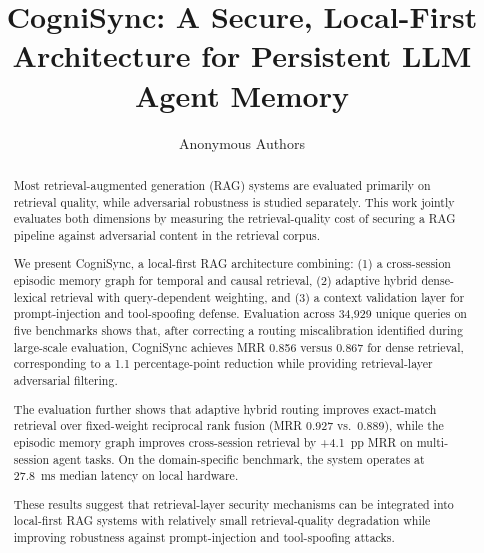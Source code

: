 \documentclass[sigconf]{acmart}
\begin{document}
\title{CogniSync: A Secure, Local-First Architecture for Persistent LLM
Agent Memory}

\author{Anonymous Authors}
\renewcommand{\shortauthors}{Anonymous et al.}

\begin{abstract}

Most retrieval-augmented generation (RAG) systems are evaluated primarily on retrieval quality, while adversarial robustness is studied separately. This work jointly evaluates both dimensions by measuring the retrieval-quality cost of securing a RAG pipeline against adversarial content in the retrieval corpus.

We present CogniSync, a local-first RAG architecture combining: (1) a cross-session episodic memory graph for temporal and causal retrieval, (2) adaptive hybrid dense-lexical retrieval with query-dependent weighting, and (3) a context validation layer for prompt-injection and tool-spoofing defense. Evaluation across 34,929 unique queries on five benchmarks shows that, after correcting a routing miscalibration identified during large-scale evaluation, CogniSync achieves MRR 0.856 versus 0.867 for dense retrieval, corresponding to a 1.1 percentage-point reduction while providing retrieval-layer adversarial filtering.

The evaluation further shows that adaptive hybrid routing improves exact-match retrieval over fixed-weight reciprocal rank fusion (MRR 0.927 vs.~0.889), while the episodic memory graph improves cross-session retrieval by +4.1~pp MRR on multi-session agent tasks. On the domain-specific benchmark, the system operates at 27.8~ms median latency on local hardware.

These results suggest that retrieval-layer security mechanisms can be integrated into local-first RAG systems with relatively small retrieval-quality degradation while improving robustness against prompt-injection and tool-spoofing attacks.

\end{abstract}
\end{document}
